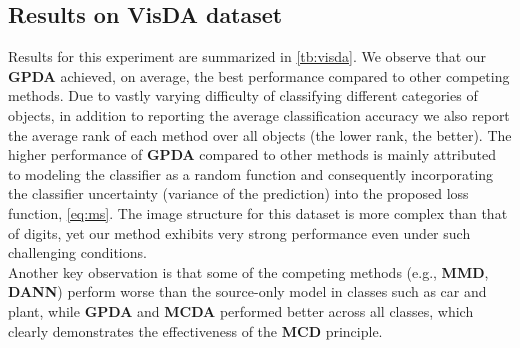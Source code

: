 \documentclass[10pt,letterpaper]{article}
\begin{document}
\subsection{Results on VisDA dataset}
Results for this experiment are summarized in \autoref{tb:visda}. We observe that our \textbf{GPDA} achieved, on average, the best performance compared to other competing methods. Due to vastly varying difficulty of classifying different categories of objects, in addition to reporting the average classification accuracy we also report the average rank of each method over all objects (the lower rank, the better). The higher performance of \textbf{GPDA} compared to other methods is mainly attributed to modeling the classifier as a random function and consequently incorporating the classifier uncertainty (variance of the prediction) into the proposed loss function, \autoref{eq:ms}. The image structure for this dataset is more complex than that of digits, yet our method exhibits very strong performance even under such challenging conditions.\\
Another key observation is that some of the competing methods (e.g., \textbf{MMD}, \textbf{DANN}) perform worse than the source-only model in classes such as car and plant, while \textbf{GPDA} and \textbf{MCDA} performed better across all classes, which clearly demonstrates the effectiveness of the \textbf{MCD} principle.
\end{document}

